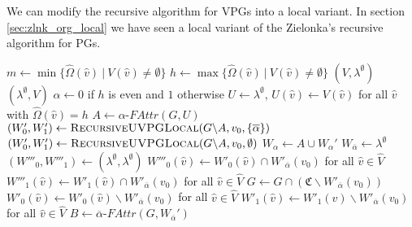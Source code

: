 We can modify the recursive algorithm for VPGs into a local variant. In section \ref{sec:zlnk_org_local} we have seen a local variant of the Zielonka's recursive algorithm for PGs.

\begin{algorithm}
	\caption{$\textsc{RecursiveUVPGLocal}(\textit{PG } G = (\\
		V : \hat{V} \rightarrow 2^\mathfrak{C},\\
		\hat{V}_0 \subseteq \hat{V},\\
		\hat{V}_1 \subseteq \hat{V},\\
		E : \hat{E} \rightarrow 2^\mathfrak{C},\\
		\hat{\Omega} : \hat{V}\rightarrow \mathbb{N},\\
		v_0 \in \hat{V},\\
		\Delta))$}\label{alg_zlnk_UVPG_local}
	\begin{algorithmic}[1]
		\State $m \gets \min\{ \hat{\Omega}(\hat{v})\ |\ V(\hat{v}) \neq \emptyset \}$
		\State $h \gets \max\{ \hat{\Omega}(\hat{v})\ |\ V(\hat{v}) \neq \emptyset \}$
		\State \Return $(V,\lambda^\emptyset)$
		\Else
		\State \Return $(\lambda^\emptyset, V)$
		\EndIf
		\EndIf
		\State $\alpha \gets 0$ if $h$ is even and $1$ otherwise
		\State $U \gets \lambda^\emptyset$, $U(\hat{v}) \gets V(\hat{v})$ for all $\hat{v}$ with $\hat{\Omega}(\hat{v}) = h$
		\State $A \gets \alpha\textit{-FAttr}(G, U)$
		\If{$\overline{\alpha} \in \Delta$}
		\State $(W_0', W_1') \gets \textsc{RecursiveUVPGLocal}(G \backslash A,v_0, \{\overline{\alpha}\})$
		\Else
		\State $(W_0', W_1') \gets \textsc{RecursiveUVPGLocal}(G \backslash A,v_0, \emptyset)$
		\EndIf
		\State $W_\alpha \gets A \cup W_\alpha'$
		\State $W_{\overline{\alpha}} \gets \lambda^\emptyset$
		\Else
		\State $(W'''_0, W'''_1) \gets (\lambda^\emptyset, \lambda^\emptyset)$
		\If{$\overline{\alpha} \in \Delta$}
		\State $W'''_0(\hat{v}) \gets W'_0(\hat{v}) \cap W'_{\overline{\alpha}}(v_0)$ for all $\hat{v} \in \hat{V}$
		\State $W'''_1(\hat{v}) \gets W'_1(\hat{v}) \cap W'_{\overline{\alpha}}(v_0)$ for all $\hat{v} \in \hat{V}$
		\State $G \gets G \cap (\mathfrak{C} \backslash W'_{\overline{\alpha}}(v_0))$
		\State $W'_0(\hat{v}) \gets W'_0(\hat{v}) \backslash W'_{\overline{\alpha}}(v_0)$ for all $\hat{v} \in \hat{V}$
		\State $W'_1(\hat{v}) \gets W'_1(\hat{v}) \backslash W'_{\overline{\alpha}}(v_0)$ for all $\hat{v} \in \hat{V}$
		\EndIf
		\State $B \gets \overline{\alpha}\textit{-FAttr}(G,W_{\overline{\alpha}}')$

\end{algorithmic}
\end{algorithm}
